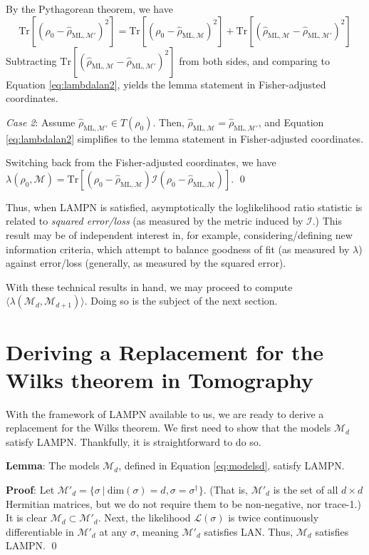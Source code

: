 \documentclass[aps,pra, twocolumn]{revtex4-1}
\newcommand{\M}{\mathcal{M}}
\newcommand{\cL}{\mathcal{L}}
\newcommand{\rhohat}{\hat{\rho}}
\newcommand{\rhoML}[1]{\rhohat_{\scriptscriptstyle{\mathrm{ML},#1}}}
\begin{document}
 By the Pythagorean theorem, we have
\[\mathrm{Tr}[(\rho_{0} -\rhoML{\M'})^{2}] =  \mathrm{Tr}[(\rho_{0} - \rhoML{\M})^{2}] + \mathrm{Tr}[(\rhoML{\M} - \rhoML{\M'})^{2}]\]
Subtracting $\mathrm{Tr}[(\rhoML{\M} - \rhoML{\M'})^{2}]$ from both sides, and comparing to Equation \eqref{eq:lambdalan2}, yields the lemma statement in Fisher-adjusted coordinates.

\emph{Case 2}: Assume $\rhoML{\M'} \in T(\rho_{0})$. Then, $\rhoML{\M}= \rhoML{\M'}$, and Equation \eqref{eq:lambdalan2} simplifies to the lemma statement in Fisher-adjusted coordinates.


Switching back from the Fisher-adjusted coordinates, we have $\lambda(\rho_{0}, \M) = \mathrm{Tr}[(\rho_{0} - \rhoML{\M})\mathcal{I}(\rho_{0} - \rhoML{\M})]$. \qed

Thus, when LAMPN is satisfied, asymptotically the loglikelihood ratio statistic is related to \emph{squared error/loss} (as measured by the metric induced by $\mathcal{I}$.) This result may be of independent interest in, for example, considering/defining new information criteria, which attempt to balance goodness of fit (as measured by $\lambda$) against error/loss (generally, as measured by the squared error).

With these technical results in hand, we may proceed to compute $\langle \lambda(\M_{d}, \M_{d+1})\rangle$. Doing so is the subject of the next section.

\section{Deriving a Replacement for the Wilks theorem in Tomography}
\label{sec:computingllrs}

With the framework of LAMPN available to us, we are ready to derive a replacement for the Wilks theorem. We first need to show that the models $\M_{d}$ satisfy LAMPN. Thankfully, it is straightforward to do so.

\textbf{Lemma}: The models $\M_{d}$, defined in Equation \eqref{eq:modelsd}, satisfy LAMPN.

\textbf{Proof}: Let $\M'_{d} = \{\sigma ~|~\mathrm{dim}(\sigma) = d, \sigma = \sigma^{\dagger}\}$. (That is, $\M'_{d}$ is the set of all $d \times d$ Hermitian matrices, but we do not require them to be non-negative, nor trace-1.) It is clear $\M_{d} \subset \M'_{d}$. Next, the likelihood $\cL(\sigma)$ is twice continuously differentiable in $\M'_{d}$ at any $\sigma$, meaning $\M'_{d}$ satisfies LAN. Thus, $\M_{d}$ satisfies LAMPN. \qed
\end{document}
